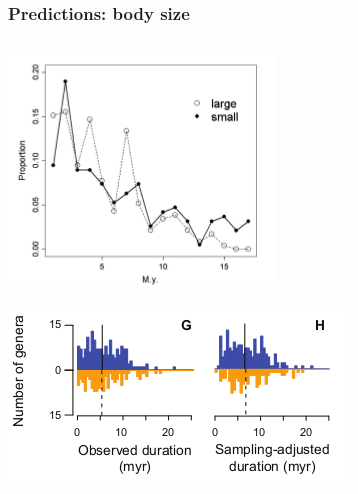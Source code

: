\documentclass{beamer} \usepackage{amsmath,amsthm}
\begin{document}
\begin{frame}
  \frametitle{Predictions: body size}

  \begin{columns}
    \begin{column}{0.5\textwidth}
      \includegraphics[height=0.4\textheight, width=\textwidth, keepaspectratio=true]{figure/liowmam}

      \tiny{}

      \includegraphics[height=0.4\textheight, width=\textwidth, keepaspectratio=true]{figure/susumu}


\end{column}
\end{columns}
\end{frame}
\end{document}
